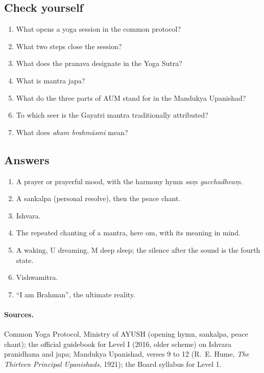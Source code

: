 \subsection*{Check yourself}
\begin{enumerate}
\item What opens a yoga session in the common protocol?
\item What two steps close the session?
\item What does the pranava designate in the Yoga Sutra?
\item What is mantra japa?
\item What do the three parts of AUM stand for in the Mandukya Upanishad?
\item To which seer is the Gayatri mantra traditionally attributed?
\item What does \emph{aham brahmāsmi} mean?
\end{enumerate}

\subsection*{Answers}
\begin{enumerate}
\item A prayer or prayerful mood, with the harmony hymn \emph{saṃ gacchadhvaṃ}.
\item A sankalpa (personal resolve), then the peace chant.
\item Ishvara.
\item The repeated chanting of a mantra, here om, with its meaning in mind.
\item A waking, U dreaming, M deep sleep; the silence after the sound is the fourth state.
\item Vishwamitra.
\item ``I am Brahman'', the ultimate reality.
\end{enumerate}

\paragraph{Sources.} Common Yoga Protocol, Ministry of AYUSH (opening hymn, sankalpa, peace chant); the official guidebook for Level I (2016, older scheme) on Ishvara pranidhana and japa; Mandukya Upanishad, verses 9 to 12 (R.~E. Hume, \emph{The Thirteen Principal Upanishads}, 1921); the Board syllabus for Level 1.
